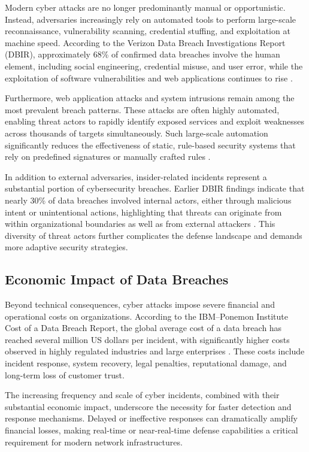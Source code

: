 \documentclass[12pt,a4paper]{report}
\begin{document}
Modern cyber attacks are no longer predominantly manual or opportunistic.
Instead, adversaries increasingly rely on automated tools to perform large-scale reconnaissance, vulnerability scanning, credential stuffing, and exploitation at machine speed.
According to the Verizon Data Breach Investigations Report (DBIR), approximately 68\% of confirmed data breaches involve the human element, including social engineering, credential misuse, and user error, while the exploitation of software vulnerabilities and web applications continues to rise \cite{verizonDBIR2024}.

Furthermore, web application attacks and system intrusions remain among the most prevalent breach patterns.
These attacks are often highly automated, enabling threat actors to rapidly identify exposed services and exploit weaknesses across thousands of targets simultaneously.
Such large-scale automation significantly reduces the effectiveness of static, rule-based security systems that rely on predefined signatures or manually crafted rules \cite{verizonDBIR2024}.

In addition to external adversaries, insider-related incidents represent a substantial portion of cybersecurity breaches.
Earlier DBIR findings indicate that nearly 30\% of data breaches involved internal actors, either through malicious intent or unintentional actions, highlighting that threats can originate from within organizational boundaries as well as from external attackers \cite{verizonDBIR2020}.
This diversity of threat actors further complicates the defense landscape and demands more adaptive security strategies.

\subsection{Economic Impact of Data Breaches}

Beyond technical consequences, cyber attacks impose severe financial and operational costs on organizations.
According to the IBM–Ponemon Institute Cost of a Data Breach Report, the global average cost of a data breach has reached several million US dollars per incident, with significantly higher costs observed in highly regulated industries and large enterprises \cite{ibmPonemon2024}.
These costs include incident response, system recovery, legal penalties, reputational damage, and long-term loss of customer trust.

The increasing frequency and scale of cyber incidents, combined with their substantial economic impact, underscore the necessity for faster detection and response mechanisms.
Delayed or ineffective responses can dramatically amplify financial losses, making real-time or near-real-time defense capabilities a critical requirement for modern network infrastructures.
\end{document}
